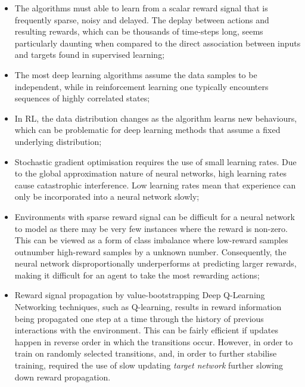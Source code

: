 \documentclass[12pt,a4paper]{article}
\begin{document}
\begin{itemize}
	\item The algorithms must able to learn from a scalar reward signal that is frequently sparse, noisy and delayed. The deplay between actions and resulting rewards, which can be thousands of time-steps long, seems particularly daunting when compared to the direct association between inputs and targets found in supervised learning;
	\item The most deep learning algorithms assume the data samples to be independent, while in reinforcement learning one typically encounters sequences of highly correlated states;
	\item In RL, the data distribution changes as the algorithm learns new behaviours, which can be problematic for deep learning methods that assume a fixed underlying distribution;
	\item Stochastic gradient optimisation requires the use of small learning rates. Due to the global approximation nature of neural networks, high learning rates cause catastrophic interference. Low learning rates mean that experience can only be incorporated into a neural network slowly;
	\item Environments with sparse reward signal can be difficult for a neural network to model as there may be very few instances where the reward is non-zero. This can be viewed as a form of class imbalance where low-reward samples outnumber high-reward samples by a unknown number. Consequently, the neural network disproportionally underperforms at predicting larger rewards, making it difficult for an agent to take the most rewarding actions;
	\item Reward signal propagation by value-bootstrapping Deep Q-Learning Networking techniques, such as Q-learning, results in reward information being propagated one step at a time through the history of previous interactions with the environment. This can be fairly efficient if updates happen in reverse order in which the transitions occur. However, in order to train on randomly selected transitions, and, in order to further stabilise training, required the use of slow updating \textit{target network} further slowing down reward propagation.
\end{itemize} 









\ifx\allfiles\undefined
%


\end{document}
